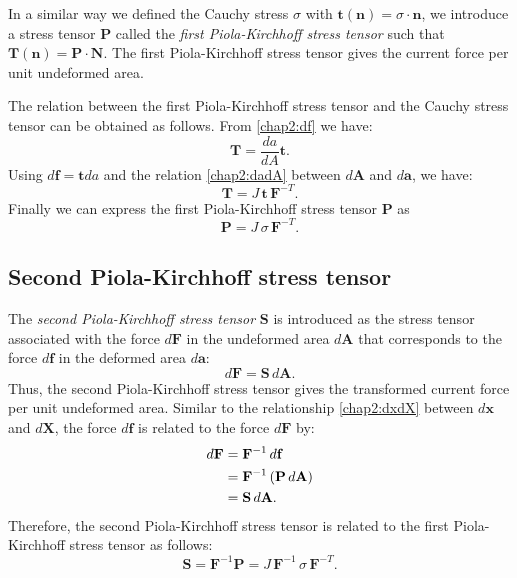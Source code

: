 In a similar way we defined the Cauchy stress $\sigma$ with $\mathbf{t}(\mathbf{n}) = \sigma \cdot \mathbf{n}$, we introduce a stress tensor $\mathbf{P}$ called the \emph{first Piola-Kirchhoff stress tensor} such that $\mathbf{T}(\mathbf{n}) = \mathbf{P} \cdot \mathbf{N}$. The first Piola-Kirchhoff stress tensor gives the current force per unit undeformed area.

The relation between the first Piola-Kirchhoff stress tensor and the Cauchy stress tensor can be obtained as follows. From \eqref{chap2:df} we have:
\begin{equation}
\mathbf{T} = \frac{da}{dA} \mathbf{t}.
\end{equation}
Using $d\mathbf{f} = \mathbf{t} da$ and the relation \eqref{chap2:dadA} between $d\mathbf{A}$ and $d\mathbf{a}$, we have:
\begin{equation}
\mathbf{T} =  J \, \mathbf{t} \, \mathbf{F}^{-T}.
\end{equation}
Finally we can express the first Piola-Kirchhoff stress tensor $\mathbf{P}$ as
\begin{equation}
\mathbf{P} = J \, \sigma \, \mathbf{F}^{-T}.
\end{equation}
	
	
	\subsection{Second Piola-Kirchhoff stress tensor}\label{chap2:PiolaStress2}
The \emph{second Piola-Kirchhoff stress tensor} $\mathbf{S}$ is introduced as the stress tensor associated with the force $d\mathbf{F}$ in the undeformed area $d\mathbf{A}$ that corresponds to the force $d\mathbf{f}$ in the deformed area $d\mathbf{a}$:
\begin{equation}
d\mathbf{F} = \mathbf{S} \, d\mathbf{A}.
\end{equation}
Thus, the second Piola-Kirchhoff stress tensor gives the transformed current force per unit undeformed area. Similar to the relationship \eqref{chap2:dxdX} between $d\mathbf{x}$ and $d\mathbf{X}$, the force $d\mathbf{f}$ is related to the force $d\mathbf{F}$ by:
\begin{align}
d\mathbf{F} &= \mathbf{F}^{-1} \, d\mathbf{f} \notag \\
&= \mathbf{F}^{-1} \, (\mathbf{P} \, d\mathbf{A}) \notag \\
&= \mathbf{S} \, d\mathbf{A}.
\end{align}
Therefore, the second Piola-Kirchhoff stress tensor is related to the first Piola-Kirchhoff stress tensor as follows:
\begin{equation}
\mathbf{S} = \mathbf{F}^{-1} \mathbf{P} = J \, \mathbf{F}^{-1} \, \sigma \, \mathbf{F}^{-T}.
\end{equation}
	
